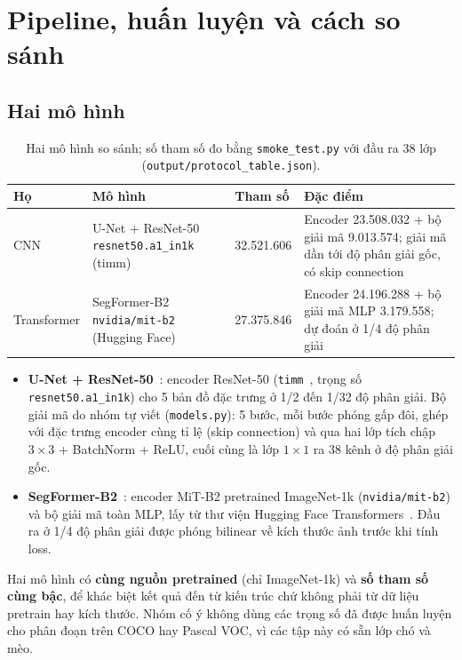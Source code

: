 \documentclass[12pt]{article}
\newcommand{\code}[1]{\texttt{#1}}
\newcommand{\st}[1]{\textbf{#1}}
\begin{document}


\section{Pipeline, huấn luyện và cách so sánh}\label{sec:pipeline}
\subsection{Hai mô hình}
\begin{table}[H]
\centering
\caption{Hai mô hình so sánh; số tham số đo bằng \code{smoke\_test.py} với đầu ra 38 lớp (\code{output/protocol\_table.json}).}\label{tab:models}
\begin{tabularx}{\linewidth}{@{}P{2.4cm}P{4.4cm}R{2.3cm}L@{}}
\toprule
Họ & Mô hình & Tham số & Đặc điểm \\\midrule
CNN & U-Net + ResNet-50 \newline \code{resnet50.a1\_in1k} (timm) & 32.521.606 & Encoder 23.508.032 + bộ giải mã 9.013.574; giải mã dần tới độ phân giải gốc, có skip connection \\
Transformer & SegFormer-B2 \newline \code{nvidia/mit-b2} (Hugging Face) & 27.375.846 & Encoder 24.196.288 + bộ giải mã MLP 3.179.558; dự đoán ở 1/4 độ phân giải \\
\bottomrule
\end{tabularx}
\end{table}

\begin{itemize}
  \item \st{U-Net + ResNet-50}~\cite{ronneberger2015,he2016}: encoder ResNet-50 (\code{timm}~\cite{timm}, trọng số
        \code{resnet50.a1\_in1k}) cho 5 bản đồ đặc trưng ở 1/2 đến 1/32 độ phân giải. Bộ giải mã do nhóm tự viết
        (\code{models.py}): 5 bước, mỗi bước phóng gấp đôi, ghép với đặc trưng encoder cùng tỉ lệ (skip connection) và qua hai
        lớp tích chập $3\times3$ + BatchNorm + ReLU, cuối cùng là lớp $1\times1$ ra 38 kênh ở độ phân giải gốc.
  \item \st{SegFormer-B2}~\cite{xie2021}: encoder MiT-B2 pretrained ImageNet-1k (\code{nvidia/mit-b2}) và bộ giải mã toàn MLP,
        lấy từ thư viện Hugging Face Transformers~\cite{wolf2020}. Đầu ra ở 1/4 độ phân giải được phóng bilinear về kích
        thước ảnh trước khi tính loss.
\end{itemize}
Hai mô hình có \st{cùng nguồn pretrained} (chỉ ImageNet-1k) và \st{số tham số cùng bậc}, để khác biệt kết quả đến từ kiến trúc
chứ không phải từ dữ liệu pretrain hay kích thước. Nhóm cố ý không dùng các trọng số đã được huấn luyện cho phân đoạn trên
COCO hay Pascal VOC, vì các tập này có sẵn lớp chó và mèo.
\end{document}
